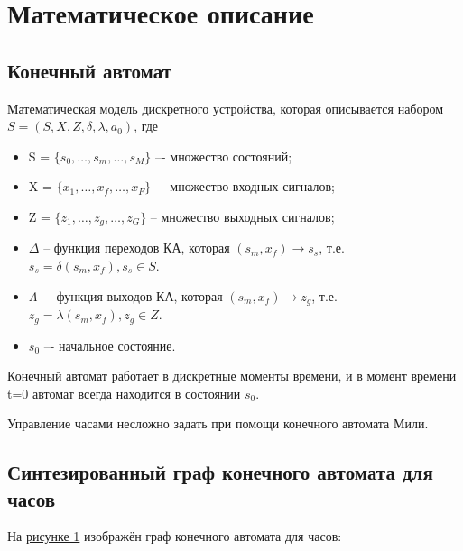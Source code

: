 \documentclass[11pt,a4paper,final]{article} %
\begin{document}
\newpage
\section{Математическое описание}
\subsection{Конечный автомат}
Математическая модель дискретного устройства, которая описывается набором $S = (S, X, Z, \delta, \lambda, a_0)$, где 
\begin{itemize}
	\item S = $\{s_0,…, s_m,…, s_M\}$ –- множество состояний;
	\item X = $\{x_1 ,…, x_f ,…, x_F\}$ –- множество входных сигналов;
	\item Z = $\{z_1 ,…, z_g ,…, z_G\}$ -- множество выходных сигналов;
	\item $\Delta$ -- функция переходов КА, которая $(s_m, x_f) \rightarrow s_s$, т.е. $s_s= \delta(s_m,x_f), s_s \in S$.
	\item $\Lambda$ –- функция выходов КА, которая $(s_m, x_f) \rightarrow z_g$, т.е. $z_g= \lambda(s_m,x_f), z_g\in Z$.
	\item $s_0$ –- начальное состояние. 
\end{itemize}
\par Конечный автомат работает в дискретные моменты времени, и в момент времени t=0 автомат всегда находится в состоянии $s_0$.
\par Управление часами несложно задать при помощи конечного автомата Мили.


\subsection{Синтезированный граф конечного автомата для часов}
На \hyperref[fig:graph]{рисунке 1} изображён граф конечного автомата для часов:
\end{document}
